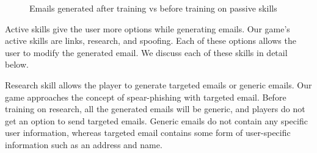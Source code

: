 \begin{figure}[ht]
    \centering

    \hfill
    \hfill

    \label{fig:passive}
    \caption{Emails generated after training vs before training on passive skills}
\end{figure}

Active skills give the user more options while generating emails. Our game's active skills are links, research, and spoofing. Each of these options allows the user to modify the generated email. We discuss each of these skills in detail below.

Research skill allows the player to generate targeted emails or generic emails. Our game approaches the concept of spear-phishing with targeted email. Before training on research, all the generated emails will be generic, and players do not get an option to send targeted emails. Generic emails do not contain any specific user information, whereas targeted email contains some form of user-specific information such as an address and name.

